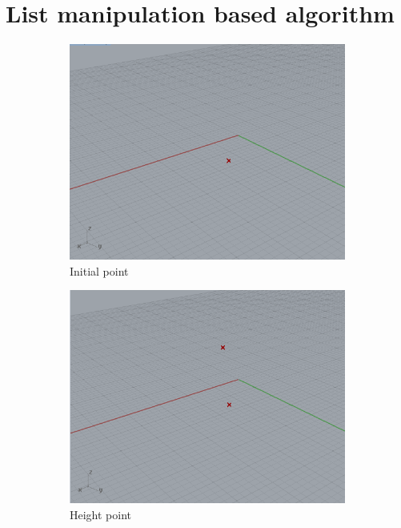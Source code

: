 \documentclass[preprint,12pt,3p]{elsarticle}
\begin{document}
\section{List manipulation based algorithm}
\label{listmanip}

\begin{figure}
\begin{subfigure}{0.3\textwidth}
  \centering
  \includegraphics[width=.9\linewidth]{a02s00.png}
  \caption{Initial point}
  \label{fig:a02s01}
\end{subfigure}%
\begin{subfigure}{0.3\textwidth}
  \centering
  \includegraphics[width=.9\linewidth]{a02s01.png}
  \caption{Height point}
  \label{fig:a02s02}
\end{subfigure}
\begin{subfigure}{0.3\textwidth}

\end{subfigure}
\end{figure}
\end{document}
